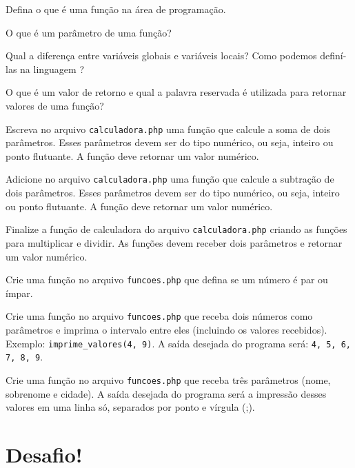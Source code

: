 \begin{description}[labelindent=30pt]
  \item [Q. 01] Defina o que é uma função na área de programação.
  \item [Q. 02] O que é um parâmetro de uma função?
  \item [Q. 03] Qual a diferença entre variáveis globais e variáveis locais? Como podemos
  definí-las na linguagem \php? 
  \item [Q. 04] O que é um valor de retorno e qual a palavra reservada é utilizada para 
  retornar valores de uma função?
  \item [Q. 05] Escreva no arquivo \texttt{calculadora.php} uma função que calcule a soma
  de dois parâmetros. Esses parâmetros devem ser do tipo numérico, ou seja, inteiro ou ponto
  flutuante. A função deve retornar um valor numérico.
  \item [Q. 06] Adicione no arquivo \texttt{calculadora.php} uma função que calcule a subtração 
  de dois parâmetros. Esses parâmetros devem ser do tipo numérico, ou seja, inteiro ou ponto
  flutuante. A função deve retornar um valor numérico.
  \item [Q. 07] Finalize a função de calculadora do arquivo \texttt{calculadora.php} criando
  as funções para multiplicar e dividir. As funções devem receber dois parâmetros e retornar
  um valor numérico.
  \item [Q. 08] Crie uma função no arquivo \texttt{funcoes.php} que defina se um número
  é par ou ímpar.
  \item [Q. 09] Crie uma função no arquivo \texttt{funcoes.php} que receba dois números como
  parâmetros e imprima o intervalo entre eles (incluindo os valores recebidos). Exemplo:
  \texttt{imprime\_valores(4, 9)}. A saída desejada do programa será: \texttt{4, 5, 6, 7, 8, 9}.
  \item [Q. 10] Crie uma função no arquivo \texttt{funcoes.php} que receba três parâmetros 
  (nome, sobrenome e cidade). A saída desejada do programa será a impressão desses valores
  em uma linha só, separados por ponto e vírgula (;).
\end{description}

\section{Desafio!}
\label{cap8-desafio}